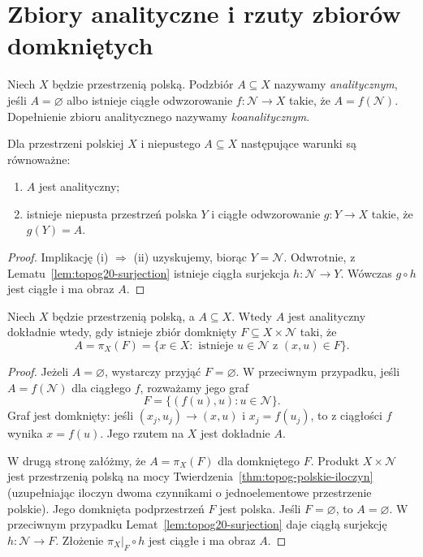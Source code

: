 \section{Zbiory analityczne i rzuty zbiorów domkniętych}
\label{sec:topog20-analityczne}

\begin{definicja}
\label{def:topog20-analityczny}
Niech \(X\) będzie przestrzenią polską.
Podzbiór \(A\subseteq X\) nazywamy
\emph{analitycznym}, jeśli
\(A=\varnothing\) albo istnieje
ciągłe odwzorowanie
\(f\colon\mathcal N\to X\)
takie, że \(A=f(\mathcal N)\).
Dopełnienie zbioru analitycznego
nazywamy \emph{koanalitycznym}.
\end{definicja}

\begin{stwierdzenie}
\label{prop:topog20-param}
Dla przestrzeni polskiej \(X\)
i niepustego \(A\subseteq X\)
następujące warunki są równoważne:
\begin{enumerate}[label=\textup{(\roman*)}]
\item \(A\) jest analityczny;
\item istnieje niepusta przestrzeń
polska \(Y\) i ciągłe odwzorowanie
\(g\colon Y\to X\) takie, że \(g(Y)=A\).
\end{enumerate}
\end{stwierdzenie}
\begin{proof}
Implikację \textup{(i)} \(\Rightarrow\)
\textup{(ii)} uzyskujemy,
biorąc \(Y=\mathcal N\).
Odwrotnie,
z Lematu~\ref{lem:topog20-surjection}
istnieje ciągła surjekcja
\(h\colon\mathcal N\to Y\).
Wówczas \(g\circ h\)
jest ciągłe i ma obraz \(A\).
\end{proof}

\begin{twierdzenie}
\label{thm:topog20-rzut}
Niech \(X\) będzie przestrzenią polską,
a \(A\subseteq X\).
Wtedy \(A\) jest analityczny
dokładnie wtedy, gdy istnieje
zbiór domknięty
\(F\subseteq X\times\mathcal N\)
taki, że
\[
 A=\pi_X(F)
   =\{x\in X:
       \text{ istnieje }u\in\mathcal N
       \text{ z }(x,u)\in F\}.
\]
\end{twierdzenie}
\begin{proof}
Jeżeli \(A=\varnothing\),
wystarczy przyjąć \(F=\varnothing\).
W przeciwnym przypadku,
jeśli \(A=f(\mathcal N)\)
dla ciągłego \(f\),
rozważamy jego graf
\[
 F=\{(f(u),u):u\in\mathcal N\}.
\]
Graf jest domknięty:
jeśli \((x_j,u_j)\to(x,u)\)
i \(x_j=f(u_j)\),
to z ciągłości \(f\)
wynika \(x=f(u)\).
Jego rzutem na \(X\)
jest dokładnie \(A\).

W drugą stronę załóżmy,
że \(A=\pi_X(F)\)
dla domkniętego \(F\).
Produkt \(X\times\mathcal N\)
jest przestrzenią polską na mocy
Twierdzenia~\ref{thm:topog-polskie-iloczyn}
(uzupełniając iloczyn dwoma czynnikami
o jednoelementowe przestrzenie polskie).
Jego domknięta podprzestrzeń
\(F\) jest polska.
Jeśli \(F=\varnothing\), to
\(A=\varnothing\).
W przeciwnym przypadku
Lemat~\ref{lem:topog20-surjection}
daje ciągłą surjekcję
\(h\colon\mathcal N\to F\).
Złożenie \( \pi_X|_F\circ h \)
jest ciągłe i ma obraz \(A\).
\end{proof}

